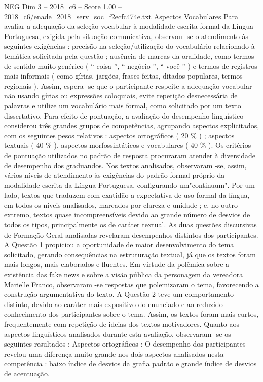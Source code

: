 \begin{textsample}{NEG Dim 3 – 2018\_c6 – Score 1.00 – 2018\_c6/enade\_2018\_serv\_soc\_f2ecfc474e.txt}
Aspectos Vocabulares Para avaliar a adequação da seleção vocabular à modalidade escrita formal da Língua Portuguesa, exigida pela situação comunicativa, observou -se o atendimento às seguintes exigências : precisão na seleção/utilização do vocabulário relacionado à temática solicitada pela questão ; ausência de marcas da oralidade, como termos de sentido muito genérico ( “ coisa ”, “ negócio ”, “ você ” ) e termos de registros mais informais ( como gírias, jargões, frases feitas, ditados populares, termos regionais ).
Assim, espera -se que o participante respeite a adequação vocabular não usando gírias ou expressões coloquiais, evite repetição desnecessária de palavras e utilize um vocabulário mais formal, como solicitado por um texto dissertativo.
Para efeito de pontuação, a avaliação do desempenho linguístico considerou três grandes grupos de competências, agrupando aspectos explicitados, com os seguintes pesos relativos : aspectos ortográficos ( 20 \% ) ; aspectos textuais ( 40 \% ), aspectos morfossintáticos e vocabulares ( 40 \% ).
Os critérios de pontuação utilizados no padrão de resposta procuraram atender à diversidade de desempenho dos graduandos.
Nos textos analisados, observaram -se, assim, vários níveis de atendimento às exigências do padrão formal próprio da modalidade escrita da Língua Portuguesa, configurando um"continuum".
Por um lado, textos que traduzem com exatidão a expectativa de uso formal da língua, em todos os níveis analisados, marcados por clareza e unidade ; e, no outro extremo, textos quase incompreensíveis devido ao grande número de desvios de todos os tipos, principalmente os de caráter textual.
As duas questões discursivas de Formação Geral analisadas revelaram desempenhos distintos dos participantes.
A Questão 1 propiciou a oportunidade de maior desenvolvimento do tema solicitado, gerando consequências na estruturação textual, já que os textos foram mais longos, mais elaborados e fluentes.
Em virtude da polêmica sobre a existência das fake news e sobre a visão pública da personagem da vereadora Marielle Franco, observaram -se respostas que polemizaram o tema, favorecendo a construção argumentativa do texto.
A Questão 2 teve um comportamento distinto, devido ao caráter mais expositivo do enunciado e ao reduzido conhecimento dos participantes sobre o tema.
Assim, os textos foram mais curtos, frequentemente com repetição de ideias dos textos motivadores.
Quanto aos aspectos linguísticos analisados durante esta avaliação, observaram -se os seguintes resultados : Aspectos ortográficos : O desempenho dos participantes revelou uma diferença muito grande nos dois aspectos analisados nesta competência : baixo índice de desvios da grafia padrão e grande índice de desvios de acentuação.

\end{textsample}
